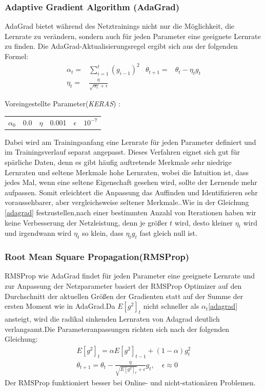 \documentclass[12pt,a4paper]{scrartcl}
\numberwithin{equation}{section}
\begin{document}
\subsubsection{Adaptive Gradient Algorithm (AdaGrad)}
AdaGrad bietet während des Netztrainings nicht nur die Möglichkeit, die Lernrate zu verändern, sondern auch für jeden Parameter eine geeignete Lernrate zu finden. Die AdaGrad-Aktualisierungsregel ergibt sich aus der folgenden Formel:
\begin{equation}\label{adagrad}
\begin{aligned}
\alpha_{t}=&\sum_{i = 1}^{t}{(g_{i-1})^2} &
\theta_{t+1} =& \theta_{t} -\eta_{t} g_t \\ \eta_{t} =& \frac{\eta}{\sqrt{\alpha_{t}}+\epsilon}
\end{aligned}
\end{equation}
\begin{center}
	Voreingestellte Parameter(\textit{KERAS}) :
	\begin{tabular}{r@{= }l c@{= }c r@{= }l}
		$ \alpha_{0} $& 0.0 & $ \eta$& 0.001& $ \epsilon $ & $ 10^{-7} $
	\end{tabular}
\end{center}
Dabei wird am Trainingsanfang eine Lernrate für jeden Parameter definiert und im Trainingsverlauf separat angepasst. 
Dieses Verfahren eignet sich gut für spärliche Daten, denn es gibt häufig auftretende Merkmale sehr niedrige Lernraten und seltene Merkmale hohe Lernraten, wobei die Intuition ist, dass jedes Mal, wenn eine seltene Eigenschaft gesehen wird, sollte der Lernende mehr aufpassen. Somit erleichtert die Anpassung das Auffinden und Identifizieren sehr voraussehbarer, aber vergleichsweise seltener Merkmale.\cite{AdaGrad}.Wie in der Gleichung \eqref{adagrad} festzustellen,nach einer bestimmten Anzahl von Iterationen haben wir keine Verbesserung der Netzleistung, denn je größer $ t $ wird, desto kleiner $ \eta_{t} $ wird und irgendwann wird $ \eta_{t} $ so klein, dass $ \eta_{t}g_{t} $ fast gleich null ist.

\subsubsection{Root Mean Square Propagation(RMSProp)}
RMSProp wie AdaGrad findet für jeden Parameter eine geeignete Lernrate und zur Anpassung der Netzparameter basiert der RMSProp Optimizer auf den Durchschnitt der aktuellen Größen der Gradienten statt auf der Summe der ersten Moment wie in AdaGrad.Da $ E[g^2]_t $ nicht schneller als $ \alpha_{t} $\eqref{adagrad} ansteigt, wird die radikal sinkenden Lernraten von Adagrad deutlich verlangsamt.Die Parameteranpassungen richten sich nach der folgenden Gleichung:
\begin{equation}\label{RMSProp}
\begin{split}
E[g^2]_t =\alpha E[g^2]_{t-1} +(1-\alpha)g^2_{t}\\
\theta_{t+1} = \theta_{t} -\frac{\eta}{\sqrt{E[g^2]_t}+\epsilon} g_t, \quad  \epsilon \approx 0
\end{split}
\end{equation}
Der RMSProp funktioniert besser bei Online- und nicht-stationären Problemen.
\end{document}
